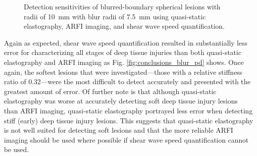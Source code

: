			\begin{figure}[!htb]
				\centering
				\caption[Detection sensitivities of blurred-boundary spherical lesions using the three investigated imaging modalities]{Detection sensitivities of blurred-boundary spherical lesions with radii of \SI{10}{\mm} with blur radii of \SI{7.5}{\mm} using quasi-static elastography, ARFI imaging, and shear wave speed quantification.}
				\label{fig:conclusion_blur}
			\end{figure}

			Again as expected, shear wave speed quantification resulted in substantially less error for characterizing all stages of deep tissue injuries than both quasi-static elastography and ARFI imaging as Fig. \ref{fig:conclusions_blur_pd} shows. Once again, the softest lesions that were investigated---those with a relative stiffness ratio of 0.32---were the most difficult to detect accurately and presented with the greatest amount of error. Of further note is that although quasi-static elastography was worse at accurately detecting soft deep tissue injury lesions than ARFI imaging, quasi-static elastography portrayed less error when detecting stiff (early) deep tissue injury lesions. This suggests that quasi-static elastography is not well suited for detecting soft lesions and that the more reliable ARFI imaging should be used where possible if shear wave speed quantification cannot be used.

